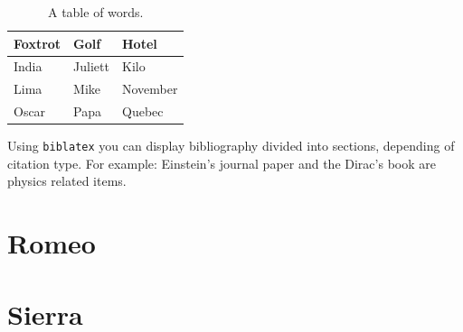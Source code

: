 \documentclass[12pt]{article}
\begin{document}
\begin{table}[H]
    \centering
    \caption{A table of words.}
    \label{tab:words}
    \begin{tabular}{l l l}
        \toprule
        \textbf{Foxtrot} & \textbf{Golf} & \textbf{Hotel} \\
        \midrule
        India & Juliett & Kilo     \\
        Lima  & Mike    & November \\
        Oscar & Papa    & Quebec \\
        \bottomrule
    \end{tabular}
\end{table}

Using \texttt{biblatex} you can display bibliography divided into sections,
depending of citation type. For example: Einstein's journal paper \cite{einstein} and the Dirac's book \cite{dirac} are physics related items.

\clearpage

\printbibliography[heading=bibintoc]
\clearpage

\begin{appendices}

\section{Romeo}
\lipsum[1-3]  %

\clearpage

\section{Sierra}
\lipsum[4-6]

\clearpage

\end{appendices}
\end{document}
